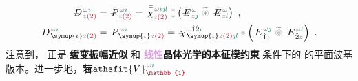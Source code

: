 \begin{subequations} \label{eq:DP^(2)-plane_wave_basis-p_pp}
\begin{align}
	\Xint{\mathcolor{gray}{-}}{30}{\bar{D}}^{\;\! \mathcolor{gray}{\omega} \textcolor{PineGreen}{\imath}}_{\;\! \mathcolor{gray}{z} \textcolor{Maroon}{(2)}} &= \Xint{\mathcolor{gray}{-}}{30}{\bar{P}}^{\;\! \mathcolor{gray}{\omega} \textcolor{PineGreen}{\imath}}_{\;\! \mathcolor{gray}{z} \textcolor{Maroon}{(2)}} = \Xint{{}^{}_{\mathcolor{gray}{-}}}{23}{\bar{\bar{\bar{\chi}}}}^{\;\! \mathcolor{gray}{\omega} \textcolor{PineGreen}{\imath \jmath l}}_{\mathcolor{gray}{z} \textcolor{Maroon}{(2)}} ~{}^{\mathcolor{gray}{*}}_{\mathcolor{gray}{*}} \left( \Xint{\mathcolor{gray}{-}}{295}{\bar{E}}^{\;\!\mathcolor{gray}{\omega}}_{\;\! \mathcolor{gray}{z} \textcolor{PineGreen}{\jmath} } ~\mathcolor{gray}{\widetilde \circledast}~ \Xint{\mathcolor{gray}{-}}{295}{\bar{E}}^{\;\!\mathcolor{gray}{\omega}}_{\;\! \mathcolor{gray}{z} \textcolor{PineGreen}{l} } \right) ~, \label{eq:vec-DP^(2)-plane_wave_basis-p_pp} \\
	\Xint{\mathcolor{gray}{-}}{30}{D}^{\;\! \mathcolor{gray}{\omega} \textcolor{PineGreen}{\imath}}_{\;\! \symup{\iota}\mathcolor{gray}{z} \textcolor{Maroon}{(2)}} &= \Xint{\mathcolor{gray}{-}}{30}{P}^{\;\! \mathcolor{gray}{\omega} \textcolor{PineGreen}{\imath}}_{\;\! \symup{\iota}\mathcolor{gray}{z} \textcolor{Maroon}{(2)}} = \Xint{{}^{}_{\mathcolor{gray}{-}}}{23}{\chi}^{\;\! \mathcolor{gray}{\omega} \hat{1} \hat{2} \textcolor{PineGreen}{\imath}}_{\;\! \symup{\iota} \mathcolor{gray}{z} \textcolor{Maroon}{(2)} \textcolor{PineGreen}{\jmath l}} \mathcolor{gray}{*} \left( \Xint{\mathcolor{gray}{-}}{295}{E}^{\;\!\mathcolor{gray}{\omega} \textcolor{PineGreen}{\jmath}}_{\;\! \hat{1} \mathcolor{gray}{z}} ~\mathcolor{gray}{\widetilde \circledast}~ \Xint{\mathcolor{gray}{-}}{295}{E}^{\;\!\mathcolor{gray}{\omega} \textcolor{PineGreen}{l}}_{\;\! \hat{2} \mathcolor{gray}{z}} \right) ~. \label{eq:components-DP^(2)-plane_wave_basis-p_pp}
\end{align}
\end{subequations}
注意到， 正是 \textbf{\textcolor{NavyBlue}{缓变振幅}近似} 和 \textbf{\textcolor{Plum}{线性}\textcolor{PineGreen}{晶体光学}的\textcolor{PineGreen}{本征模}约束}  条件下的  的\textcolor{PineGreen}{平面波基}版本。进一步地，若 $\Xint{\mathcolor{gray}{-}}{25}{\bar{\bar{\mathsfit{V}}}}^{\;\! \mathcolor{gray}{\omega} \textcolor{PineGreen}{\imath}}_{\textcolor{Maroon}{\mathbb{1}}}$ 
